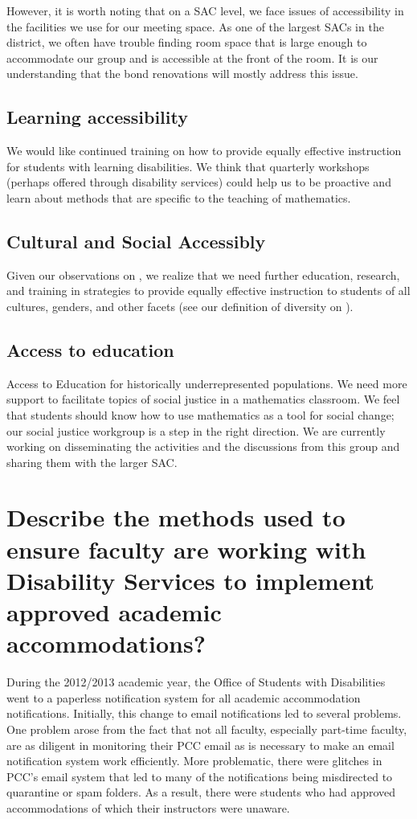 However, it is worth noting that on a SAC level, we face issues of
accessibility in the facilities we use for our meeting space. As one of the
largest SACs in the district, we often have trouble finding room space that is
large enough to accommodate our group and is accessible at the front of the
room. It is our understanding that the bond renovations will mostly address
this issue.

\subsection{Learning accessibility}
We would like continued training on how to provide equally effective
instruction for students with learning disabilities. We think that quarterly
workshops (perhaps offered through disability services) could help us to be
proactive and learn about methods that are specific to the teaching of
mathematics.

\subsection{Cultural and Social Accessibly}
Given our observations on , we realize that we need
further education, research, and training in strategies to provide equally
effective instruction to students of all cultures, genders, and other facets
(see our definition of diversity on ).

\subsection{Access to education}
Access to Education for historically underrepresented populations. We need more
support to facilitate topics of social justice in a mathematics classroom. We
feel that students should know how to use mathematics as a tool for social
change; our social justice workgroup is a step in the right direction. We are
currently working on disseminating the activities and the discussions from this
group and sharing them with the larger SAC.

\section{Describe the methods used to ensure faculty are working with Disability Services to implement approved academic accommodations?}
During the 2012/2013 academic year, the Office of Students with Disabilities
went to a paperless notification system for all academic accommodation
notifications.  Initially, this change to email notifications led to several
problems.  One problem arose from the fact that not all faculty, especially
part-time faculty, are as diligent in monitoring their PCC email as is
necessary to make an email notification system work efficiently.  More
problematic, there were glitches in PCC's email system that led to many of the
notifications being misdirected to quarantine or spam folders.  As a result,
there were students who had approved accommodations of which their instructors
were unaware.


